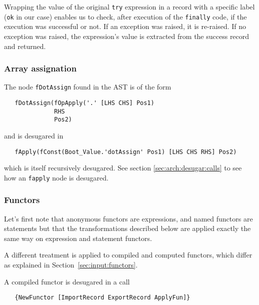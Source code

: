 \documentclass[a4paper]{memoir}
\begin{document}
Wrapping the value of the original \lstinline!try! expression in a record
with a specific label (\lstinline!ok! in our case) enables us to check, 
after execution of the \lstinline!finally! code, if the
execution was successful or not. If an exception was raised, it is re-raised. If
no exception was raised, the expression's value is extracted from the success
record and returned.



\subsubsection{Array assignation}\label{sec:arch:desugar:dotassign}
The node \lstinline!fDotAssign! found in the AST is of the form 
\begin{lstlisting}
   fDotAssign(fOpApply('.' [LHS CHS] Pos1) 
              RHS 
              Pos2) 
\end{lstlisting}
and is desugared in 
\begin{lstlisting}
   fApply(fConst(Boot_Value.'dotAssign' Pos1) [LHS CHS RHS] Pos2)
\end{lstlisting}
which is itself recursively desugared. See section \ref{sec:arch:desugar:calls}
to see how an \lstinline!fapply! node is desugared.


\subsubsection{Functors}\label{sec:arch:desugar:functors}
Let's first note that anonymous functors are expressions, and named functors are
statements but that the transformations described below are applied exactly the same way
on expression and statement functors.

A different treatment is applied to compiled and computed functors, which differ
as explained in Section~\ref{sec:input:functors}.

A compiled functor is desugared in a call 
\begin{lstlisting}
   {NewFunctor [ImportRecord ExportRecord ApplyFun]}
\end{lstlisting}
\end{document}
